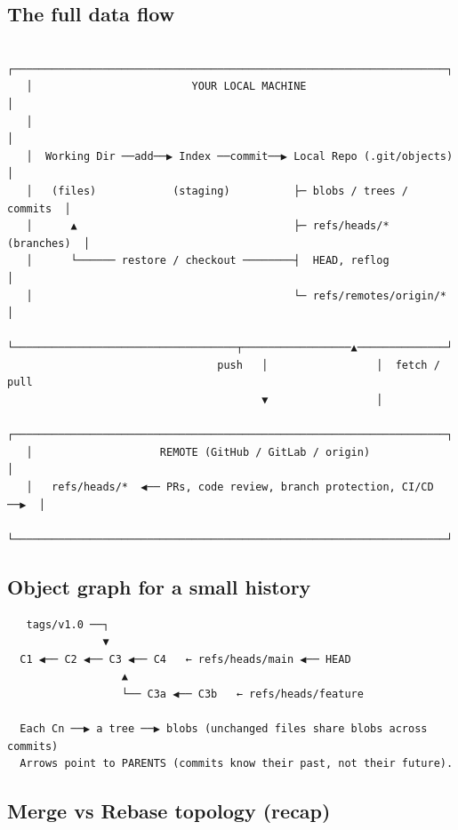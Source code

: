 \documentclass[11pt]{article}
\begin{document}
\subsection{The full data flow}\label{the-full-data-flow}

\setcodelang{}

\begin{verbatim}
   ┌────────────────────────────────────────────────────────────────────┐
   │                         YOUR LOCAL MACHINE                          │
   │                                                                     │
   │  Working Dir ──add──▶ Index ──commit──▶ Local Repo (.git/objects)   │
   │   (files)            (staging)          ├─ blobs / trees / commits  │
   │      ▲                                  ├─ refs/heads/* (branches)  │
   │      └────── restore / checkout ────────┤  HEAD, reflog             │
   │                                         └─ refs/remotes/origin/*    │
   └───────────────────────────────────┬─────────────────▲──────────────┘
                                 push   │                 │  fetch / pull
                                        ▼                 │
   ┌────────────────────────────────────────────────────────────────────┐
   │                    REMOTE (GitHub / GitLab / origin)                │
   │   refs/heads/*  ◀── PRs, code review, branch protection, CI/CD ──▶  │
   └────────────────────────────────────────────────────────────────────┘
\end{verbatim}

\subsection{Object graph for a small history}\label{object-graph-for-a-small-history}

\setcodelang{}

\begin{verbatim}
   tags/v1.0 ──┐
               ▼
  C1 ◀── C2 ◀── C3 ◀── C4   ← refs/heads/main ◀── HEAD
                  ▲
                  └── C3a ◀── C3b   ← refs/heads/feature

  Each Cn ──▶ a tree ──▶ blobs (unchanged files share blobs across commits)
  Arrows point to PARENTS (commits know their past, not their future).
\end{verbatim}

\subsection{Merge vs Rebase topology (recap)}\label{merge-vs-rebase-topology-recap}
\end{document}
